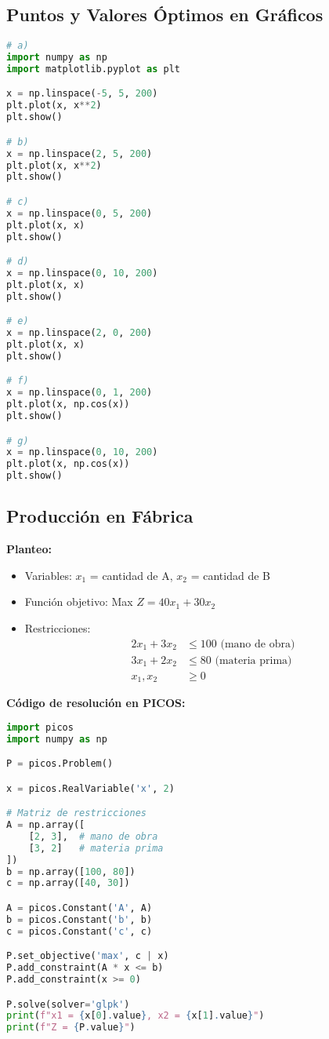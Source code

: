\documentclass[12pt]{article}
\begin{document}
\subsection{Puntos y Valores Óptimos en Gráficos}
\begin{lstlisting}[language=Python]
# a)
import numpy as np
import matplotlib.pyplot as plt

x = np.linspace(-5, 5, 200)
plt.plot(x, x**2)
plt.show()

# b)
x = np.linspace(2, 5, 200)
plt.plot(x, x**2)
plt.show()

# c)
x = np.linspace(0, 5, 200)
plt.plot(x, x)
plt.show()

# d)
x = np.linspace(0, 10, 200)
plt.plot(x, x)
plt.show()

# e)
x = np.linspace(2, 0, 200)
plt.plot(x, x)
plt.show()

# f)
x = np.linspace(0, 1, 200)
plt.plot(x, np.cos(x))
plt.show()

# g)
x = np.linspace(0, 10, 200)
plt.plot(x, np.cos(x))
plt.show()
\end{lstlisting}

\subsection{Producción en Fábrica}

\textbf{Planteo:}
\begin{itemize}
\item Variables: $x_1$ = cantidad de A, $x_2$ = cantidad de B
\item Función objetivo: Max $Z = 40x_1 + 30x_2$
\item Restricciones:
  \begin{align*}
  2x_1 + 3x_2 &\leq 100 \text{ (mano de obra)} \\
  3x_1 + 2x_2 &\leq 80 \text{ (materia prima)} \\
  x_1, x_2 &\geq 0
  \end{align*}
\end{itemize}

\textbf{Código de resolución en PICOS:}
\begin{lstlisting}[language=Python]
import picos
import numpy as np

P = picos.Problem()

x = picos.RealVariable('x', 2)

# Matriz de restricciones
A = np.array([
    [2, 3],  # mano de obra
    [3, 2]   # materia prima
])
b = np.array([100, 80])
c = np.array([40, 30])

A = picos.Constant('A', A)
b = picos.Constant('b', b)
c = picos.Constant('c', c)

P.set_objective('max', c | x)
P.add_constraint(A * x <= b)
P.add_constraint(x >= 0)

P.solve(solver='glpk')
print(f"x1 = {x[0].value}, x2 = {x[1].value}")
print(f"Z = {P.value}")
\end{lstlisting}
\end{document}
